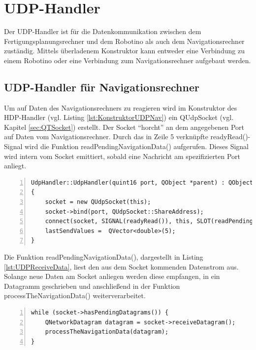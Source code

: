 \section{UDP-Handler} 
\label{sec:UdpHandler}

Der UDP-Handler ist für die Datenkommunikation zwischen dem Fertigungsplanungsrechner und dem Robotino als auch dem Navigationsrechner zuständig. Mittels überladenem Konstruktor kann entweder eine Verbindung zu einem Robotino oder eine Verbindung zum Navigationsrechner aufgebaut werden. 

\subsection{UDP-Handler für Navigationsrechner}

Um auf Daten des Navigationsrechners zu reagieren wird im Konstruktor des HDP-Handler (vgl. Listing \ref{lst:KonstruktorUDPNav}) ein QUdpSocket (vgl. Kapitel \ref{sec:QTSocket}) erstellt. Der Socket "`horcht"' an dem angegebenen Port auf Daten vom Navigationsrechner. Durch das in Zeile 5 verknüpfte readyRead()-Signal wird die Funktion readPendingNavigationData() aufgerufen. Dieses Signal wird intern vom Socket emittiert, sobald eine Nachricht am spezifizierten Port anliegt. 

\begin{lstlisting}[frame=single, breaklines=true, numbers=left, stepnumber=2, firstnumber=1, numberstyle = \tiny, caption=UDP-Handler Konstruktor für Navigationsdatenaustausch,label=lst:KonstruktorUDPNav]
UdpHandler::UdpHandler(quint16 port, QObject *parent) : QObject(parent)
{
    socket = new QUdpSocket(this);
    socket->bind(port, QUdpSocket::ShareAddress);
    connect(socket, SIGNAL(readyRead()), this, SLOT(readPendingNavigationData()));
    lastSendValues =  QVector<double>(5);
}
\end{lstlisting}

Die Funktion readPendingNavigationData(), dargestellt in Listing \ref{lst:UDPReceiveData}, liest den aus dem Socket kommenden Datenstrom aus. Solange neue Daten am Socket anliegen werden diese empfangen, in ein Datagramm geschrieben und anschließend in der Funktion processTheNavigationData() weiterverarbeitet. 

\begin{lstlisting}[frame=single, breaklines=true, numbers=left, stepnumber=2, firstnumber=1, numberstyle = \tiny, caption=Daten über UDP empfangen,label=lst:UDPReceiveData]
while (socket->hasPendingDatagrams()) {
    QNetworkDatagram datagram = socket->receiveDatagram();
    processTheNavigationData(datagram);
}
\end{lstlisting}

